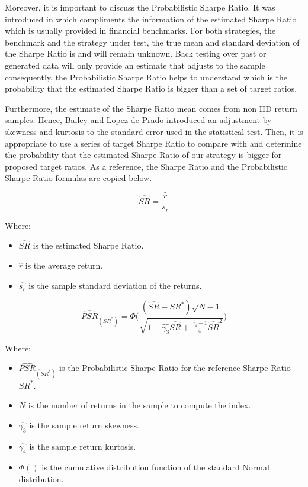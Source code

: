 
Moreover, it is important to discuss the Probabilistic Sharpe Ratio. It was
introduced in \cite{sharpe_paper} which compliments the information of the
estimated Sharpe Ratio which is usually provided in financial benchmarks.
For both strategies, the benchmark and the strategy under test, the true mean
and standard deviation of the Sharpe Ratio is and will remain unknown. Back
testing over past or generated data will only provide an estimate that adjusts
to the sample consequently, the Probabilistic Sharpe Ratio helps to understand
which is the probability that the estimated Sharpe Ratio is bigger than a set of
target ratios.

Furthermore, the estimate of the Sharpe Ratio mean comes from non IID return samples. Hence, Bailey and 
Lopez de Prado introduced an adjustment by skewness and kurtosis to the standard
error used in the statistical test. Then, it is appropriate to use a series of
target Sharpe Ratio to compare with and determine the probability that the
estimated Sharpe Ratio of our strategy is bigger for proposed target ratios. As a
reference, the Sharpe Ratio and the Probabilistic Sharpe Ratio formulas are copied
below.

\[\hat{SR} = \frac{\hat{r}}{s_{r}}\]

Where:

\begin{itemize}
  \item $\hat{SR}$ is the estimated Sharpe Ratio.
  \item $\hat{r}$ is the average return.
  \item $\hat{s_{r}}$ is the sample standard deviation of the returns.
\end{itemize}

\begin{equation}
  \label{eqn:prob_sharpe_ratio}
  \hat{PSR}_{(SR^*)} = \Phi \Bigg( \frac{(\hat{SR} - SR^*) \sqrt{N-1}}{\sqrt{1 - \hat{\gamma_3}\hat{SR} + \frac{\hat{\gamma_4} - 1}{4}\hat{SR}^2}} \Bigg)
\end{equation}

Where:

\begin{itemize}
  \item $\hat{PSR}_{(SR^*)}$ is the Probabilistic Sharpe Ratio for the reference
        Sharpe Ratio $SR^*$.
  \item $N$ is the number of returns in the sample to compute the index.
  \item $\hat{\gamma_3}$ is the sample return skewness.
  \item $\hat{\gamma_4}$ is the sample return kurtosis.
  \item $\Phi()$ is the cumulative distribution function of the standard Normal
        distribution.
\end{itemize}

